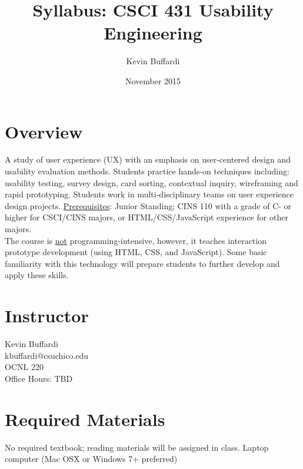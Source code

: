 \documentclass[12pt]{article}
\title{Syllabus: CSCI 431 Usability Engineering}
\author{Kevin Buffardi}
\date{November 2015}
\begin{document}
  \maketitle
  \section*{Overview}	 
  \noindent
  A study of user experience (UX) with an emphasis on user-centered design and usability evaluation methods. Students practice hands-on techniques including: usability testing, survey design, card sorting, contextual inquiry, wireframing and rapid prototyping. Students work in multi-disciplinary teams on user experience design projects.
  \newline
  \newline
  \underline{Prerequisites}: Junior Standing; CINS 110 with a grade of C- or higher for CSCI/CINS majors, or HTML/CSS/JavaScript experience for other majors. \\
  \newline
  The course is \underline{not} programming-intensive, however, it teaches interaction prototype development (using HTML, CSS, and JavaScript). Some basic familiarity with this technology will prepare students to further develop and apply these skills. 
  
  \section*{Instructor}
  \noindent
  Kevin Buffardi \\
  kbuffardi@csuchico.edu \\
  OCNL 220 \\
  Office Hours: TBD\\

  \section*{Required Materials}
  \noindent
  No required textbook; reading materials will be assigned in class.
  \newline
  Laptop computer (Mac OSX or Windows 7+ preferred)
\end{document}
